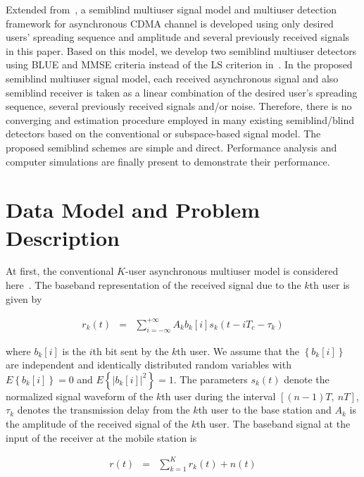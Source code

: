 \documentclass[a4paper,10pt,fleqn, twocolumn]{IEEETran}
\begin{document}
Extended from~\cite{Wang03d,Wang03e}, a semiblind multiuser signal
model and multiuser detection framework for asynchronous CDMA
channel is developed using only desired users' spreading sequence
and amplitude and several previously received signals in this
paper. Based on this model, we develop two semiblind multiuser
detectors using BLUE and MMSE criteria instead of the LS criterion
in~\cite{Wang03d,Wang03e}. In the proposed semiblind multiuser
signal model, each received asynchronous signal and also semiblind
receiver is taken as a linear combination of the desired user's
spreading sequence, several previously received signals and/or
noise. Therefore, there is no converging and estimation procedure
employed in many existing semiblind/blind detectors based on the
conventional or subspace-based signal model. The proposed
semiblind schemes are simple and direct. Performance analysis and
computer simulations are finally present to demonstrate their
performance.

\section{Data Model and Problem Description}
At first, the conventional $K$-user asynchronous multiuser model
is considered here~\cite{Verd98}. The baseband representation of
the received signal due to the $k$th user is given by

\begin{equation}
\begin{array}{rcl}
r_k(t)&=&\sum\limits_{i=-\infty}^{+\infty}A_k b_k[i]
s_k(t-iT_c-\tau_k)
\end{array}
\end{equation}

\noindent where $b_k[i]$ is the $i$th bit sent by the $k$th user.
We assume that the $\left\{b_k[i]\right\}$ are independent and
identically distributed random variables with
$E\left\{b_k[i]\right\}=0$ and $E\left\{|b_k[i]|^2\right\}=1$. The
parameters $s_k(t)$ denote the normalized signal waveform of the
$k$th user during the interval $[(n-1)T,\ nT]$, $\tau_k$ denotes
the transmission delay from the $k$th user to the base station and
$A_k$ is the amplitude of the received signal of the $k$th user.
The baseband signal at the input of the receiver at the mobile
station is

\begin{equation}
\begin{array}{rcl}
r(t)&=&\sum\limits_{k=1}^{K}r_k(t)+n(t)
\end{array}
\end{equation}
\end{document}
